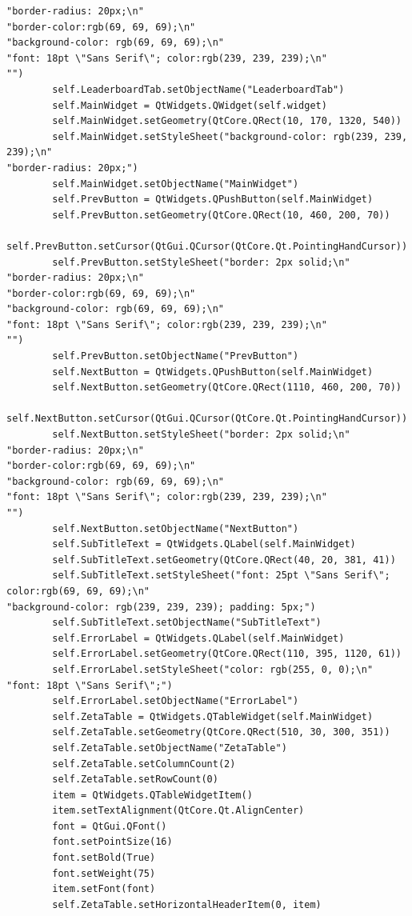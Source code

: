 \documentclass{article}
\begin{document}
\begin{lstlisting}
"border-radius: 20px;\n"
"border-color:rgb(69, 69, 69);\n"
"background-color: rgb(69, 69, 69);\n"
"font: 18pt \"Sans Serif\"; color:rgb(239, 239, 239);\n"
"")
        self.LeaderboardTab.setObjectName("LeaderboardTab")
        self.MainWidget = QtWidgets.QWidget(self.widget)
        self.MainWidget.setGeometry(QtCore.QRect(10, 170, 1320, 540))
        self.MainWidget.setStyleSheet("background-color: rgb(239, 239, 239);\n"
"border-radius: 20px;")
        self.MainWidget.setObjectName("MainWidget")
        self.PrevButton = QtWidgets.QPushButton(self.MainWidget)
        self.PrevButton.setGeometry(QtCore.QRect(10, 460, 200, 70))
        self.PrevButton.setCursor(QtGui.QCursor(QtCore.Qt.PointingHandCursor))
        self.PrevButton.setStyleSheet("border: 2px solid;\n"
"border-radius: 20px;\n"
"border-color:rgb(69, 69, 69);\n"
"background-color: rgb(69, 69, 69);\n"
"font: 18pt \"Sans Serif\"; color:rgb(239, 239, 239);\n"
"")
        self.PrevButton.setObjectName("PrevButton")
        self.NextButton = QtWidgets.QPushButton(self.MainWidget)
        self.NextButton.setGeometry(QtCore.QRect(1110, 460, 200, 70))
        self.NextButton.setCursor(QtGui.QCursor(QtCore.Qt.PointingHandCursor))
        self.NextButton.setStyleSheet("border: 2px solid;\n"
"border-radius: 20px;\n"
"border-color:rgb(69, 69, 69);\n"
"background-color: rgb(69, 69, 69);\n"
"font: 18pt \"Sans Serif\"; color:rgb(239, 239, 239);\n"
"")
        self.NextButton.setObjectName("NextButton")
        self.SubTitleText = QtWidgets.QLabel(self.MainWidget)
        self.SubTitleText.setGeometry(QtCore.QRect(40, 20, 381, 41))
        self.SubTitleText.setStyleSheet("font: 25pt \"Sans Serif\"; color:rgb(69, 69, 69);\n"
"background-color: rgb(239, 239, 239); padding: 5px;")
        self.SubTitleText.setObjectName("SubTitleText")
        self.ErrorLabel = QtWidgets.QLabel(self.MainWidget)
        self.ErrorLabel.setGeometry(QtCore.QRect(110, 395, 1120, 61))
        self.ErrorLabel.setStyleSheet("color: rgb(255, 0, 0);\n"
"font: 18pt \"Sans Serif\";")
        self.ErrorLabel.setObjectName("ErrorLabel")
        self.ZetaTable = QtWidgets.QTableWidget(self.MainWidget)
        self.ZetaTable.setGeometry(QtCore.QRect(510, 30, 300, 351))
        self.ZetaTable.setObjectName("ZetaTable")
        self.ZetaTable.setColumnCount(2)
        self.ZetaTable.setRowCount(0)
        item = QtWidgets.QTableWidgetItem()
        item.setTextAlignment(QtCore.Qt.AlignCenter)
        font = QtGui.QFont()
        font.setPointSize(16)
        font.setBold(True)
        font.setWeight(75)
        item.setFont(font)
        self.ZetaTable.setHorizontalHeaderItem(0, item)

\end{lstlisting}
\end{document}
